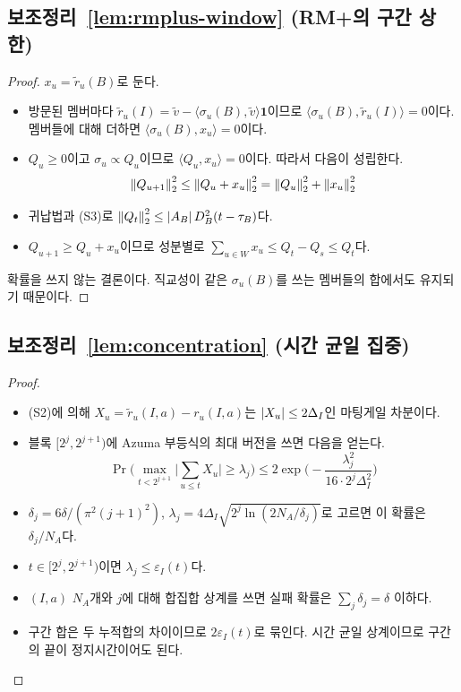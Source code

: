 \subsection{보조정리~\ref{lem:rmplus-window} (RM+의 구간 상한)}
\begin{proof}
$x_u=\tilde r_u(B)$로 둔다.
\begin{itemize}
  \item 방문된 멤버마다 $\tilde r_u(I)=\tilde v-\langle\sigma_u(B),\tilde v\rangle\mathbf 1$이므로 $\langle\sigma_u(B),\tilde r_u(I)\rangle=0$이다. 멤버들에 대해 더하면 $\langle\sigma_u(B),x_u\rangle=0$이다.
  \item $Q_u\ge0$이고 $\sigma_u\propto Q_u$이므로 $\langle Q_u,x_u\rangle=0$이다. 따라서 다음이 성립한다.
    \[
    \left\lVert Q_{u+1}\right\rVert_2^2\le\left\lVert Q_u+x_u\right\rVert_2^2=\left\lVert Q_u\right\rVert_2^2+\left\lVert x_u\right\rVert_2^2
    \]
  \item 귀납법과 (S3)로 $\left\lVert Q_t\right\rVert_2^2\le\left\lvert A_B\right\rvert D_B^2(t-\tau_B)$다.
  \item $Q_{u+1}\ge Q_u+x_u$이므로 성분별로 $\sum_{u\in W}x_u\le Q_t-Q_s\le Q_t$다.
\end{itemize}
확률을 쓰지 않는 결론이다. 직교성이 같은 $\sigma_u(B)$를 쓰는 멤버들의 합에서도 유지되기 때문이다.
\end{proof}

\subsection{보조정리~\ref{lem:concentration} (시간 균일 집중)}
\begin{proof}\mbox{}
\begin{itemize}
  \item (S2)에 의해 $X_u=\tilde r_u(I,a)-r_u(I,a)$는 $\left\lvert X_u\right\rvert\le2\Delta_I$인 마팅게일 차분이다.
  \item 블록 $[2^j,2^{j+1})$에 Azuma 부등식의 최대 버전을 쓰면 다음을 얻는다.
    \[
    \Pr\Big(\max_{t<2^{j+1}}\big\lvert\textstyle\sum_{u\le t}X_u\big\rvert\ge\lambda_j\Big)\le2\exp\!\Big(-\frac{\lambda_j^2}{16\cdot2^j\Delta_I^2}\Big)
    \]
  \item $\delta_j=6\delta/(\pi^2(j+1)^2)$, $\lambda_j=4\Delta_I\sqrt{2^j\ln(2N_A/\delta_j)}$로 고르면 이 확률은 $\delta_j/N_A$다.
  \item $t\in[2^j,2^{j+1})$이면 $\lambda_j\le\varepsilon_I(t)$다.
  \item $(I,a)$ $N_A$개와 $j$에 대해 합집합 상계를 쓰면 실패 확률은 $\sum_j\delta_j=\delta$ 이하다.
  \item 구간 합은 두 누적합의 차이이므로 $2\varepsilon_I(t)$로 묶인다. 시간 균일 상계이므로 구간의 끝이 정지시간이어도 된다.
\end{itemize}
\end{proof}

